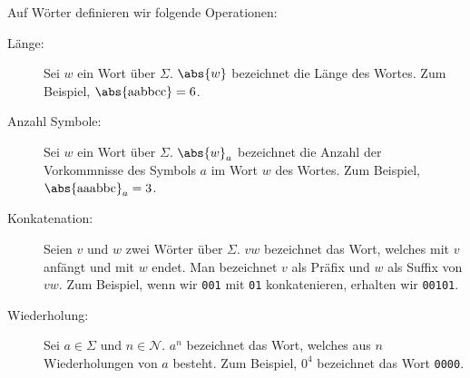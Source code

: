 %
%
Auf Wörter definieren wir folgende Operationen:
\begin{description}
    \item[Länge:] Sei \(w\) ein Wort über \(\Sigma\). \(\abs{w}\) bezeichnet die Länge des Wortes. Zum Beispiel, \(\abs{\text{aabbcc}}=6\).
    \item[Anzahl Symbole:] Sei \(w\) ein Wort über \(\Sigma\). \(\abs{w}_a\) bezeichnet die Anzahl der Vorkommnisse des Symbols \(a\) im Wort \(w\) des Wortes. Zum Beispiel, \(\abs{\text{aaabbc}}_a=3\).
    \item[Konkatenation:] Seien \(v\) und \(w\) zwei Wörter über \(\Sigma\). \(vw\) bezeichnet das Wort, welches mit \(v\) anfängt und mit \(w\) endet. Man bezeichnet \(v\) als Präfix und \(w\) als Suffix von \(vw\). Zum Beispiel, wenn wir \texttt{001} mit \texttt{01} konkatenieren, erhalten wir \texttt{00101}.
    \item[Wiederholung:] Sei \(a \in \Sigma\) und \(n \in \mathcal{N}\). \(a^n\) bezeichnet das Wort, welches aus \(n\) Wiederholungen von \(a\) besteht. Zum Beispiel, \(\text{0}^4\) bezeichnet das Wort \texttt{0000}.
\end{description}
